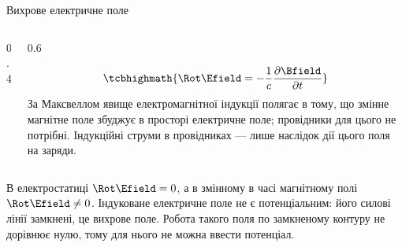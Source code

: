 \documentclass[onlytextwidth]{beamer}
\begin{document}
\begin{frame}{Вихрове електричне поле}{}
\begin{onlyenv}
\begin{columns}
\begin{column}{0.4\linewidth}
\begin{pict}
				\end{pict}
			\end{column}
			\begin{column}{0.6\linewidth}
				\begin{block}{}\justifying
					\begin{equation*}
						\tcbhighmath{\Rot\Efield = - \frac1c \frac{\partial\Bfield}{\partial t}}
					\end{equation*}
					За Максвеллом \alert{явище електромагнітної індукції} полягає в тому, що змінне магнітне поле збуджує в просторі електричне поле;
					провідники для цього не потрібні. Індукційні струми в провідниках --- лише наслідок дії цього поля на заряди.
				\end{block}
			\end{column}
		\end{columns}
		\begin{block}{}\justifying
			В електростатиці $\Rot\Efield = 0$, а в змінному в часі магнітному полі $\Rot\Efield \neq 0$. Індуковане електричне поле
			\alert{не є потенціальним}: його силові лінії замкнені, це \alert{вихрове} поле. Робота такого поля по замкненому контуру не дорівнює
			нулю, тому для нього не можна ввести потенціал.
		\end{block}
	\end{onlyenv}
\end{frame}
\end{document}

